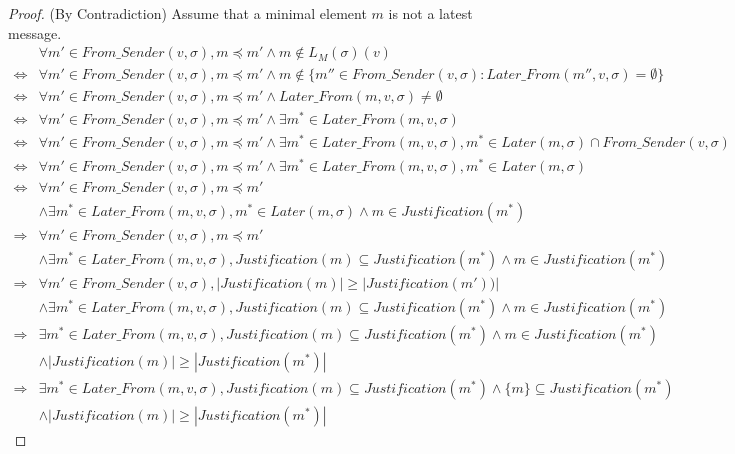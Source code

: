 \begin{proof}(By Contradiction)
  Assume that a minimal element $m$ is not a latest message.
\begin{align*}
  & \forall m' \in From\_Sender(v, \sigma), m \preceq m' \land m \notin L_M(\sigma)(v)
  \\
  \Longleftrightarrow& \forall m' \in From\_Sender(v, \sigma), m \preceq m' \land m \notin \{m'' \in From\_Sender(v, \sigma): Later\_From(m'', v, \sigma) = \emptyset\}
  \\
  \Longleftrightarrow& \forall m' \in From\_Sender(v, \sigma), m \preceq m' \land Later\_From(m, v, \sigma) \not = \emptyset
  \\
  \Longleftrightarrow& \forall m' \in From\_Sender(v, \sigma), m \preceq m' \land \exists m^* \in Later\_From(m, v, \sigma)
  \\
  \Longleftrightarrow& \forall m' \in From\_Sender(v, \sigma), m \preceq m' \land \exists m^* \in Later\_From(m, v, \sigma),  m^* \in Later(m, \sigma) \cap From\_Sender(v, \sigma)
  \\
  \Longleftrightarrow& \forall m' \in From\_Sender(v, \sigma), m \preceq m' \land \exists m^* \in Later\_From(m, v, \sigma), m^* \in Later(m, \sigma)
  \\
  \Longleftrightarrow& \forall m' \in From\_Sender(v, \sigma), m \preceq m' \\ &\land \exists m^* \in Later\_From(m, v, \sigma), m^* \in Later(m, \sigma) \land m \in Justification(m^*)
  \\
  \Longrightarrow& \forall m' \in From\_Sender(v, \sigma), m \preceq m' \\ &\land \exists m^* \in Later\_From(m, v, \sigma), Justification(m) \subseteq Justification(m^*) \land m \in Justification(m^*)
  \\
  \Longrightarrow& \forall m' \in From\_Sender(v, \sigma), |Justification(m)| \geq |Justification(m'))| \\ &\land \exists m^* \in Later\_From(m, v, \sigma), Justification(m) \subseteq Justification(m^*) \land m \in Justification(m^*)
  \\
  \Longrightarrow& \exists m^* \in Later\_From(m, v, \sigma), Justification(m) \subseteq Justification(m^*)  \land m \in Justification(m^*) \\ &\land |Justification(m)| \geq |Justification(m^*)|
  \\
  \Longrightarrow& \exists m^* \in Later\_From(m, v, \sigma), Justification(m) \subseteq Justification(m^*)  \land \{m\} \subseteq Justification(m^*) \\ &\land |Justification(m)| \geq |Justification(m^*)|

\end{align*}
\end{proof}

